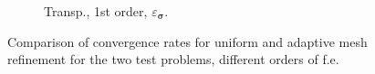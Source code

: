 \documentclass[a4paper,12pt]{amsart}
\numberwithin{equation}{section}
\def\bsigma{{\boldsymbol \sigma}}
\begin{document}
\begin{figure}[h!]
\begin{subfigure}[t]{0.3\textwidth}
	\caption{Transp., 1st order, $\varepsilon_{\bsigma}$.}
	
\end{subfigure}

\caption{Comparison of convergence rates for uniform and adaptive mesh refinement for the two test problems, different orders of f.e.}
\label{fig:comparison_ur_amr}
\end{figure}
\end{document}
